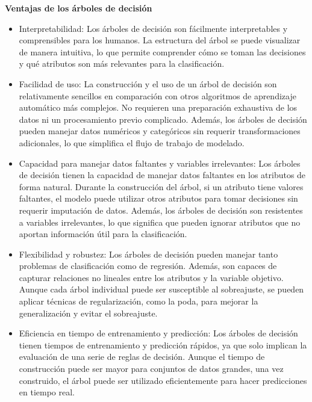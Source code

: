 \textbf{Ventajas de los árboles de decisión}
\begin{itemize}
    \item Interpretabilidad: Los árboles de decisión son fácilmente interpretables y comprensibles para los humanos. La estructura del árbol se puede visualizar de manera intuitiva, lo que permite comprender cómo se toman las decisiones y qué atributos son más relevantes para la clasificación.
    \item Facilidad de uso: La construcción y el uso de un árbol de decisión son relativamente sencillos en comparación con otros algoritmos de aprendizaje automático más complejos. No requieren una preparación exhaustiva de los datos ni un procesamiento previo complicado. Además, los árboles de decisión pueden manejar datos numéricos y categóricos sin requerir transformaciones adicionales, lo que simplifica el flujo de trabajo de modelado.
    \item Capacidad para manejar datos faltantes y variables irrelevantes: Los árboles de decisión tienen la capacidad de manejar datos faltantes en los atributos de forma natural. Durante la construcción del árbol, si un atributo tiene valores faltantes, el modelo puede utilizar otros atributos para tomar decisiones sin requerir imputación de datos. Además, los árboles de decisión son resistentes a variables irrelevantes, lo que significa que pueden ignorar atributos que no aportan información útil para la clasificación.
    \item Flexibilidad y robustez: Los árboles de decisión pueden manejar tanto problemas de clasificación como de regresión. Además, son capaces de capturar relaciones no lineales entre los atributos y la variable objetivo. Aunque cada árbol individual puede ser susceptible al sobreajuste, se pueden aplicar técnicas de regularización, como la poda, para mejorar la generalización y evitar el sobreajuste.
    \item Eficiencia en tiempo de entrenamiento y predicción: Los árboles de decisión tienen tiempos de entrenamiento y predicción rápidos, ya que solo implican la evaluación de una serie de reglas de decisión. Aunque el tiempo de construcción puede ser mayor para conjuntos de datos grandes, una vez construido, el árbol puede ser utilizado eficientemente para hacer predicciones en tiempo real.
\end{itemize}

